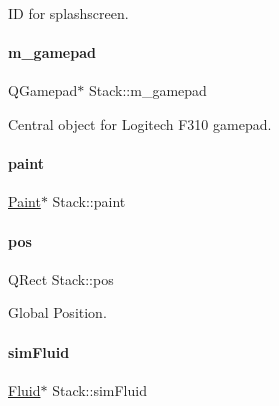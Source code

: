 ID for splashscreen. 

\mbox{\label{classStack_a63dddeeffcc3340219b93b716f9b8bc9}} 
\paragraph{\texorpdfstring{m\_gamepad}{m\_gamepad}}
{\footnotesize\ttfamily Q\+Gamepad$\ast$ Stack\+::m\+\_\+gamepad}



Central object for Logitech F310 gamepad. 

\mbox{\label{classStack_ae20446c30ae36243a42983dcdc371258}} 
\paragraph{\texorpdfstring{paint}{paint}}
{\footnotesize\ttfamily \mbox{\hyperlink{classPaint}{Paint}}$\ast$ Stack\+::paint\hspace{0.3cm}{\ttfamily [private]}}

\mbox{\label{classStack_a89c03088e1dd8cf4eb333638b059d30a}} 
\paragraph{\texorpdfstring{pos}{pos}}
{\footnotesize\ttfamily Q\+Rect Stack\+::pos\hspace{0.3cm}{\ttfamily [private]}}



Global Position. 

\mbox{\label{classStack_a528378e89155254d8245e44892e93bd7}} 
\paragraph{\texorpdfstring{simFluid}{simFluid}}
{\footnotesize\ttfamily \mbox{\hyperlink{classFluid}{Fluid}}$\ast$ Stack\+::sim\+Fluid\hspace{0.3cm}{\ttfamily [private]}}



